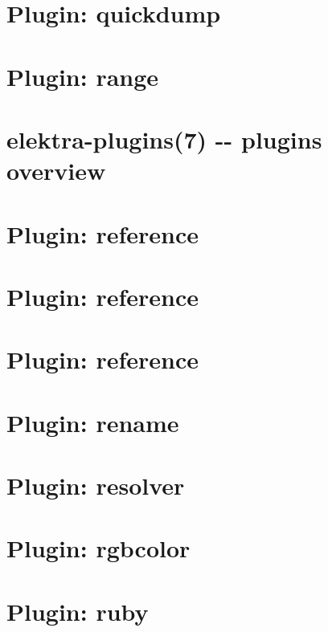 \documentclass[twoside]{book}
\newcommand{\+}{\discretionary{\mbox{\scriptsize$\hookleftarrow$}}{}{}}
\begin{document}
\chapter{Plugin\+: quickdump}
\label{autotoc_md533}

\chapter{Plugin\+: range}
\label{autotoc_md540}

\chapter{elektra-\/plugins(7) -\/-\/ plugins overview}
\label{src_plugins_README_md}

\chapter{Plugin\+: reference}
\label{autotoc_md561}

\chapter{Plugin\+: reference}
\label{autotoc_md562}

\chapter{Plugin\+: reference}
\label{autotoc_md564}

\chapter{Plugin\+: rename}
\label{autotoc_md570}

\chapter{Plugin\+: resolver}
\label{autotoc_md586}

\chapter{Plugin\+: rgbcolor}
\label{autotoc_md596}

\chapter{Plugin\+: ruby}
\label{autotoc_md599}

\end{document}
